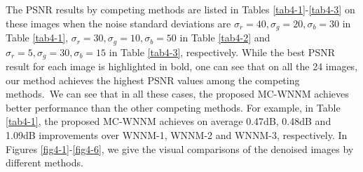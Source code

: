 The PSNR results by competing methods are listed in Tables \ref{tab4-1}-\ref{tab4-3} on these images when the noise standard deviations are $\sigma_{r}=40, \sigma_{g}=20, \sigma_{b}=30$ in Table \ref{tab4-1}, $\sigma_{r}=30, \sigma_{g}=10, \sigma_{b}=50$ in Table \ref{tab4-2} and $\sigma_{r}=5, \sigma_{g}=30, \sigma_{b}=15$ in Table \ref{tab4-3}, respectively. While the best PSNR result for each image is highlighted in bold, one can see that on all the 24 images, our method achieves the highest PSNR values among the competing methods.\ We can see that in all these cases, the proposed MC-WNNM achieves better performance than the other competing methods. For example, in Table \ref{tab4-1}, the proposed MC-WNNM achieves on average 0.47dB, 0.48dB and 1.09dB improvements over WNNM-1, WNNM-2 and WNNM-3, respectively. In Figures \ref{fig4-1}-\ref{fig4-6}, we give the visual comparisons of the denoised images by different methods.

